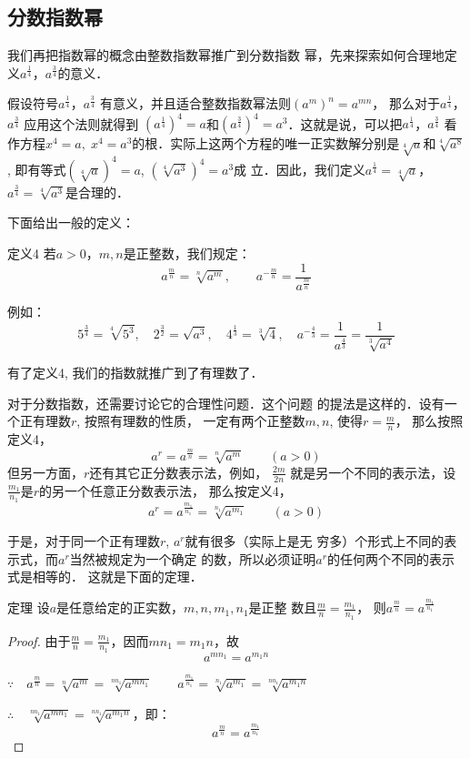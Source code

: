 \subsection{分数指数幂}
我们再把指数幂的概念由整数指数幂推广到分数指数
幂，先来探索如何合理地定义$a^{\tfrac{1}{4}}$，$a^{\tfrac{3}{4}}$的意义．

假设符号$a^{\tfrac{1}{4}}$，$a^{\tfrac{3}{4}}$
有意义，并且适合整数指数幂法则$(a^m)^n=a^{mn}$，
那么对于$a^{\tfrac{1}{4}}$，$a^{\tfrac{3}{4}}$
应用这个法则就得到
$\left(a^{\tfrac{1}{4}}\right)^4=a$和$\left(a^{\tfrac{3}{4}}\right)^4=a^3$．这就是说，可以把$a^{\tfrac{1}{4}}$，$a^{\tfrac{3}{4}}$
看作方程$x^4=a,\; x^4=a^3$的根．实际上这两个方程的唯一正实数解分别是$\sqrt[4]{a}$和$\sqrt[4]{a^8}$, 即有等式$\left(\sqrt[4]{a}\right)^4=a$, $\left(\sqrt[4]{a^3}\right)^4=a^3$成
立．因此，我们定义$a^{\tfrac{1}{4}}=\sqrt[4]{a}$，$a^{\tfrac{3}{4}}=\sqrt[4]{a^3}$是合理的．

下面给出一般的定义：
\begin{blk}{定义4}
若$a>0$，$m,n$是正整数，我们规定：
 \[a^{\tfrac{m}{n}}=\sqrt[n]{a^m},\qquad a^{-\tfrac{m}{n}}=\frac{1}{a^{\tfrac{m}{n}}}\]
\end{blk}

例如：
\[5^{\tfrac{3}{4}}=\sqrt[4]{5^3},\quad 2^{\tfrac{3}{2}}=\sqrt{a^3},\quad 4^{\tfrac{1}{3}}=\sqrt[3]{4},\quad a^{-\tfrac{4}{3}}=\frac{1}{a^{\tfrac{4}{3}}}=\frac{1}{\sqrt[3]{a^4}} \]

有了定义4, 我们的指数就推广到了有理数了．

对于分数指数，还需要讨论它的合理性问题．这个问题
的提法是这样的．设有一个正有理数$r$, 按照有理数的性质，
一定有两个正整数$m,n$, 使得$r=\frac{m}{n}$，
那么按照定义4，
\[a^r=a^{\tfrac{m}{n}}=\sqrt[n]{a^m}\qquad (a>0)\]
但另一方面，$r$还有其它正分数表示法，例如，
$\frac{2m}{2n}$
就是另一个不同的表示法，设
$\frac{m_1}{n_1}$是$r$的另一个任意正分数表示法，
那么按定义4，
\[a^r=a^{\tfrac{m_1}{n_1}}=\sqrt[n_1]{a^{m_1}}\qquad (a>0)\]

于是，对于同一个正有理数$r$, $a^r$就有很多（实际上是无
穷多）个形式上不同的表示式，而$a^r$当然被规定为一个确定
的数，所以必须证明$a^r$的任何两个不同的表示式是相等的．
这就是下面的定理．

\begin{blk}{定理}
    设$a$是任意给定的正实数，$m,n,m_1,n_1$是正整
    数且$\frac{m}{n}=\frac{m_1}{n_1}$，
    则$a^{\tfrac{m}{n}}=a^{\tfrac{m_1}{n_1}}$   
\end{blk}

\begin{proof}
由于$\frac{m}{n}=\frac{m_1}{n_1}$，因而$mn_1=m_1n$，故
\[a^{mn_1}=a^{m_1n}\]

$\because\quad a^{\tfrac{m}{n}}=\sqrt[n]{a^m}=\sqrt[nn_1]{a^{mn_1}}\qquad 
a^{\tfrac{m_1}{n_1}}=\sqrt[n_1]{a^{m_1}}=\sqrt[nn_1]{a^{m_1n}}$

$\therefore\quad \sqrt[nn_1]{a^{mn_1}}=\sqrt[nn_1]{a^{m_1n}}$，即：
\[a^{\tfrac{m}{n}}=a^{\tfrac{m_1}{n_1}}\]
\end{proof}
    
